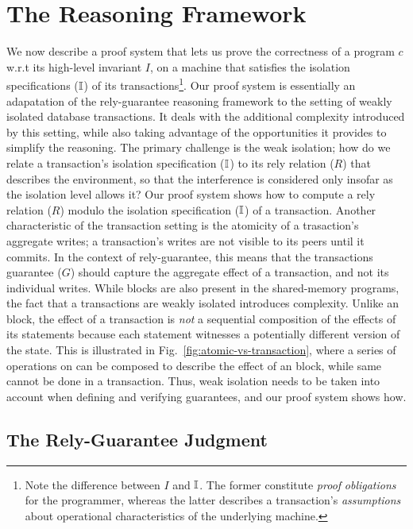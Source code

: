 \section{The Reasoning Framework}
\label{sec:reasoning}

We now describe a proof system that lets us prove the correctness of a \txnimp
program $c$ w.r.t its high-level invariant $I$, on a machine that
satisfies the isolation specifications ($\mathbb{I}$) of its
transactions\footnote{Note the difference between $I$ and $\mathbb{I}$. The
former constitute \emph{proof} \emph{obligations} for the programmer,
whereas the latter describes a transaction's \emph{assumptions} about
operational characteristics of the underlying machine.}.  Our proof
system is essentially an adapatation of the rely-guarantee reasoning
framework to the setting of weakly isolated database transactions. It
deals with the additional complexity introduced by this setting, while
also taking advantage of the opportunities it provides to simplify the
reasoning. The primary challenge is the weak isolation; how do we
relate a transaction's isolation specification ($\mathbb{I}$) to its rely
relation ($R$) that describes the environment, so that the
interference is considered only insofar as the isolation level allows
it? Our proof system shows how to compute a rely relation ($R$) modulo
the isolation specification ($\mathbb{I}$) of a transaction. Another
characteristic of the transaction setting is the atomicity of a
trasaction's aggregate writes; a transaction's writes are not visible
to its peers until it commits. In the context of rely-guarantee, this
means that the transactions guarantee ($G$) should capture the
aggregate effect of a transaction, and not its individual writes.
While  blocks are also present in the shared-memory
programs, the fact that a transactions are weakly isolated introduces
complexity.  Unlike an  block, the effect of a transaction
is \emph{not} a sequential composition of the effects of its
statements because each statement witnesses a potentially different
version of the state. This is illustrated in
Fig.~\ref{fig:atomic-vs-transaction}, where a series of operations on
 can be composed to describe the effect of an  block,
while same cannot be done in a transaction. Thus, weak isolation needs
to be taken into account when defining and verifying guarantees, and
our proof system shows how. 

\subsection{The Rely-Guarantee Judgment}
\label{sec:rely-guarantee}

